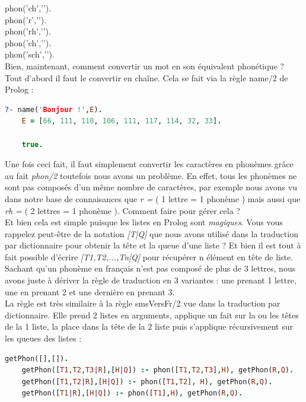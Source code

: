 \documentclass[11pt]{report}
\begin{document}
	\indent phon('ch','').\\
	\indent phon('r','').\\
	\indent phon('rh','').\\
	\indent phon('ch','').\\
	\indent phon('sch','').\\
	
	Bien, maintenant, comment convertir un mot en son équivalent phonétique ? Tout d'abord il faut le convertir en chaîne. Cela se fait via la règle name/2 de Prolog :
	
	\begin{lstlisting}[language=Prolog]
	?- name('Bonjour !',E). 
	E = [66, 111, 110, 106, 111, 117, 114, 32, 33].
	
	true.
	\end{lstlisting}
	
	Une fois ceci fait, il faut simplement convertir les caractères en phonèmes grâce au fait {\em phon/2} toutefois nous avons un problème. En effet, tous les phonèmes ne sont pas composés d'un même nombre de caractères, par exemple nous avons vu dans notre base de connaisances que {\em r = } ( 1 lettre = 1 phonème ) mais aussi que {\em rh = } ( 2 lettres = 1 phonème ). Comment faire pour gérer cela ?\\
	Et bien cela est simple puisque les listes en Prolog sont {\em magiques}. Vous vous rappelez peut-être de la notation {\em [T|Q]} que nous avons utilisé dans la traduction par dictionnaire pour obtenir la tête et la queue d'une liste ? Et bien il est tout à fait possible d'écrire {\em [T1,T2,...,Tn|Q]} pour récupérer n élément en tête de liste.\\
	Sachant qu'un phonème en français n'est pas composé de plus de 3 lettres, nous avons juste à dériver la règle de traduction en 3 variantes : une prenant 1 lettre, une en prenant 2 et une dernière en prenant 3.\\ 
	La règle est très similaire à la règle smsVersFr/2 vue dans la traduction par dictionnaire. Elle prend 2 listes en arguments, applique un fait sur la ou les têtes de la 1 liste, la place dans la tête de la 2 liste puis s'applique récursivement sur les queues des listes :
	
	\begin{lstlisting}[language=Prolog]
	getPhon([],[]).
	getPhon([T1,T2,T3|R],[H|Q]) :- phon([T1,T2,T3],H), getPhon(R,Q).
	getPhon([T1,T2|R],[H|Q]) :- phon([T1,T2], H), getPhon(R,Q).
	getPhon([T1|R],[H|Q]) :- phon([T1],H), getPhon(R,Q).
	\end{lstlisting}
	
\end{document}
